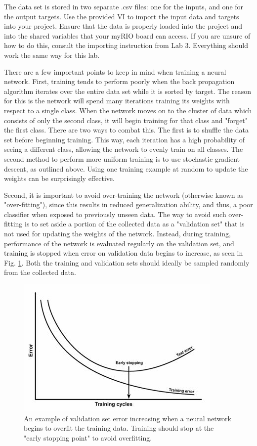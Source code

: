 \documentclass{article}
\begin{document}
The data set is stored in two separate .csv files: one for the inputs, and one for the output targets. Use the provided VI to import the input data and targets into your project. Ensure that the data is properly loaded into the project and into the shared variables that your myRIO board can access. If you are unsure of how to do this, consult the importing instruction from Lab 3. Everything should work the same way for this lab. 

There are a few important points to keep in mind when training a neural network.  First, training tends to perform poorly when the back propagation algorithm iterates over the entire data set while it is sorted by target. The reason for this is the network will spend many iterations training its weights with respect to a single class. When the network moves on to the cluster of data which consists of only the second class, it will begin training for that class and "forget" the first class. There are two ways to combat this. The first is to shuffle the data set before beginning training. This way, each iteration has a high probability of seeing a different class, allowing the network to evenly train on all classes. The second method to perform more uniform training is to use stochastic gradient descent, as outlined above. Using one training example at random to update the weights can be surprisingly effective. 

Second, it is important to avoid over-training the network (otherwise known as "over-fitting"), since this results in reduced generalization ability, and thus, a poor classifier when exposed to previously unseen data.  The way to avoid such over-fitting is to set aside a portion of the collected data as a "validation set" that is not used for updating the weights of the network.  Instead, during training, performance of the network is evaluated regularly on the validation set, and training is stopped when error on  validation data begins to increase, as seen in Fig. \ref{fig:val}.  Both the training and validation sets should ideally be sampled randomly from the collected data.  

\begin{figure}[h]
\centering
\includegraphics[scale=1]{figs/val.jpg}
\caption{An example of validation set error increasing when a neural network begins to overfit the training data.  Training should stop at the "early stopping point" to avoid overfitting. \cite{val}}
\label{fig:val}
\end{figure}
\end{document}
